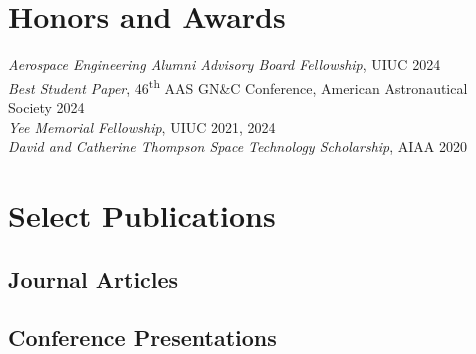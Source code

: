 \documentclass[letterpaper,11pt]{article}
\begin{document}
	\section{Honors and Awards}

	\textit{Aerospace Engineering Alumni Advisory Board Fellowship}, UIUC \hfill 2024 \\
	\textit{Best Student Paper}, 46\textsuperscript{th} AAS GN\&C Conference, American Astronautical Society \hfill 2024 \\
	\textit{Yee Memorial Fellowship}, UIUC \hfill 2021, 2024 \\
	\textit{David and Catherine Thompson Space Technology Scholarship}, AIAA \hfill 2020 \\


	\section{Select Publications}

	\subsection*{Journal Articles}
	\begin{refsection}
		\nocite{*}
		\printbibliography[heading=none]
	\end{refsection}

	\subsection*{Conference Presentations}
	\begin{refsection}
		\nocite{*}
		\printbibliography[heading=none]
	\end{refsection}
	
	
	\thispagestyle{lastpage}
	
\end{document}
